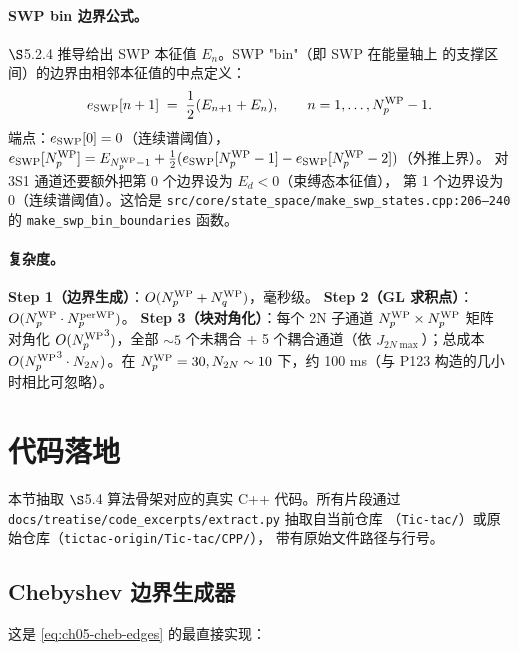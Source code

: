 \paragraph{SWP bin 边界公式。}
\(\S\)5.2.4 推导给出 SWP 本征值 \(E_n\)。SWP "bin"（即 SWP 在能量轴上
的支撑区间）的边界由相邻本征值的中点定义：
\begin{equation}
\label{eq:ch05-SWP-bin-edge}
e_{\rm SWP}[n+1] \;=\; \frac{1}{2}(E_{n+1} + E_n),
\qquad n = 1, \ldots, {N_{p}^{\text{WP}}} - 1.
\end{equation}
端点：\(e_{\rm SWP}[0] = 0\)（连续谱阈值），
\(e_{\rm SWP}[{N_{p}^{\text{WP}}}] = E_{{N_{p}^{\text{WP}}}-1} + \tfrac{1}{2}(e_{\rm SWP}[{N_{p}^{\text{WP}}}-1] -
e_{\rm SWP}[{N_{p}^{\text{WP}}}-2])\)（外推上界）。
对 3S1 通道还要额外把第 0 个边界设为 \(E_d < 0\)（束缚态本征值），
第 1 个边界设为 0（连续谱阈值）。这恰是
\texttt{src/core/state\_space/make\_swp\_states.cpp:206--240} 的
\texttt{make\_swp\_bin\_boundaries} 函数。

\paragraph{复杂度。}
\textbf{Step 1（边界生成）}：\(O({N_{p}^{\text{WP}}} + {N_{q}^{\text{WP}}})\)，毫秒级。
\textbf{Step 2（GL 求积点）}：\(O({N_{p}^{\text{WP}}} \cdot N_p^{\rm per WP})\)。
\textbf{Step 3（块对角化）}：每个 2N 子通道 \({N_{p}^{\text{WP}}} \times {N_{p}^{\text{WP}}}\) 矩阵
对角化 \(O({N_{p}^{\text{WP}}}^3)\)，全部 \(\sim 5\) 个未耦合 + 5 个耦合通道（依
\(J_{2N\max}\)）；总成本 \(O({N_{p}^{\text{WP}}}^3 \cdot N_{2N})\)。在 \({N_{p}^{\text{WP}}} = 30,
N_{2N} \sim 10\) 下，约 100 ms（与 P123 构造的几小时相比可忽略）。

\section{代码落地}
\label{sec:ch05-code}

本节抽取 \(\S\)5.4 算法骨架对应的真实 C++ 代码。所有片段通过
\texttt{docs/treatise/code\_excerpts/extract.py} 抽取自当前仓库
（\texttt{Tic-tac/}）或原始仓库（\texttt{tictac-origin/Tic-tac/CPP/}），
带有原始文件路径与行号。

\subsection{Chebyshev 边界生成器}
\label{subsec:ch05-code-chebyshev}

这是 \cref{eq:ch05-cheb-edges} 的最直接实现：


